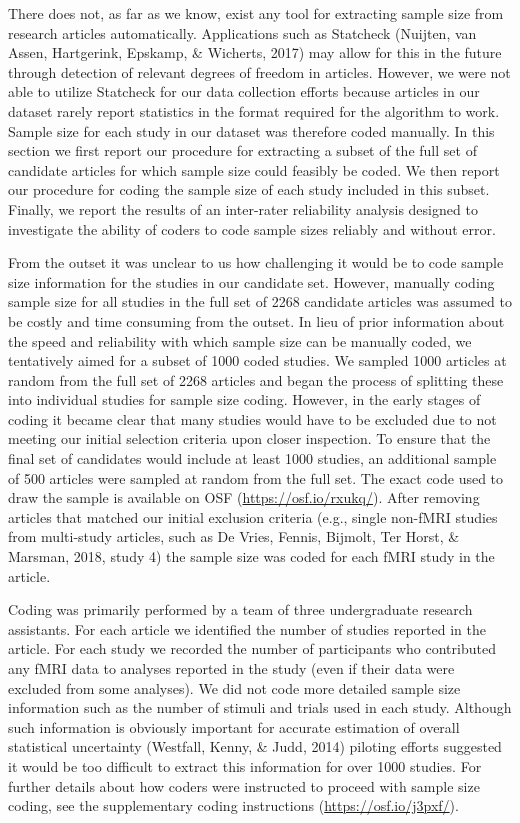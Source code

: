 \documentclass[
  man,floatsintext]{apa6}
\begin{document}
There does not, as far as we know, exist any tool for extracting sample size from research articles automatically. Applications such as Statcheck (Nuijten, van Assen, Hartgerink, Epskamp, \& Wicherts, 2017) may allow for this in the future through detection of relevant degrees of freedom in articles. However, we were not able to utilize Statcheck for our data collection efforts because articles in our dataset rarely report statistics in the format required for the algorithm to work. Sample size for each study in our dataset was therefore coded manually. In this section we first report our procedure for extracting a subset of the full set of candidate articles for which sample size could feasibly be coded. We then report our procedure for coding the sample size of each study included in this subset. Finally, we report the results of an inter-rater reliability analysis designed to investigate the ability of coders to code sample sizes reliably and without error.

From the outset it was unclear to us how challenging it would be to code sample size information for the studies in our candidate set. However, manually coding sample size for all studies in the full set of 2268 candidate articles was assumed to be costly and time consuming from the outset. In lieu of prior information about the speed and reliability with which sample size can be manually coded, we tentatively aimed for a subset of 1000 coded studies. We sampled 1000 articles at random from the full set of 2268 articles and began the process of splitting these into individual studies for sample size coding. However, in the early stages of coding it became clear that many studies would have to be excluded due to not meeting our initial selection criteria upon closer inspection. To ensure that the final set of candidates would include at least 1000 studies, an additional sample of 500 articles were sampled at random from the full set. The exact code used to draw the sample is available on OSF (\url{https://osf.io/rxukq/}). After removing articles that matched our initial exclusion criteria (e.g., single non-fMRI studies from multi-study articles, such as De Vries, Fennis, Bijmolt, Ter Horst, \& Marsman, 2018, study 4) the sample size was coded for each fMRI study in the article.

Coding was primarily performed by a team of three undergraduate research assistants. For each article we identified the number of studies reported in the article. For each study we recorded the number of participants who contributed any fMRI data to analyses reported in the study (even if their data were excluded from some analyses). We did not code more detailed sample size information such as the number of stimuli and trials used in each study. Although such information is obviously important for accurate estimation of overall statistical uncertainty (Westfall, Kenny, \& Judd, 2014) piloting efforts suggested it would be too difficult to extract this information for over 1000 studies. For further details about how coders were instructed to proceed with sample size coding, see the supplementary coding instructions (\url{https://osf.io/j3pxf/}).
\end{document}
